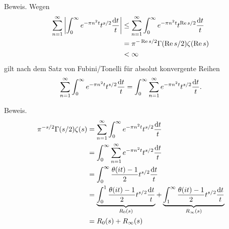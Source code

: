 \begin{frame}
    \begin{block}{Beweis.}%
    Wegen
    \begin{align*}
        \sum_{n = 1}^{\infty} \left|\int_0^\infty e^{-\pi n^2 t}t^{s/2} \frac{\mathrm{d} t}{t}\right| &\leq \sum_{n = 1}^{\infty} \int_0^\infty e^{-\pi n^2 t}t^{\operatorname{Re} s/2} \frac{\mathrm{d} t}{t}\\
        &= \pi^{- \operatorname{Re} s/2} \Gamma(\operatorname{Re} s/2)\zeta(\operatorname{Re} s)\\
        &< \infty
    \end{align*}
    gilt nach dem Satz von Fubini/Tonelli für absolut konvergente Reihen
    \[
        \sum_{n = 1}^{\infty} \int_0^\infty e^{-\pi n^2 t}t^{s/2} \frac{\mathrm{d} t}{t} = \int_0^\infty \sum_{n = 1}^{\infty} e^{-\pi n^2 t}t^{s/2} \frac{\mathrm{d} t}{t}.
    \]
    \end{block}
\end{frame}
\begin{frame}
\begin{block}{Beweis.}%
    \vspace*{-0.5cm}
    \begin{align*}
        \pi^{-s/2} \Gamma(s/2)\zeta(s) &= \sum_{n = 1}^{\infty} \int_0^\infty e^{-\pi n^2 t}t^{s/2} \frac{\mathrm{d} t}{t}\\
        &= \int_0^\infty \sum_{n = 1}^{\infty} e^{-\pi n^2 t}t^{s/2} \frac{\mathrm{d} t}{t}\\
        &= \int_0^\infty \frac{\theta(it)-1}{2} t^{s/2} \frac{\mathrm{d} t}{t}\\
        &= \underbrace{\int_0^1 \frac{\theta(it)-1}{2} t^{s/2} \frac{\mathrm{d} t}{t}}_{R_0(s)} + \underbrace{\int_1^\infty \frac{\theta(it)-1}{2} t^{s/2} \frac{\mathrm{d} t}{t}}_{R_\infty(s)}\\
        &= R_0(s) + R_\infty(s)
    \end{align*}
\end{block}
\end{frame}
